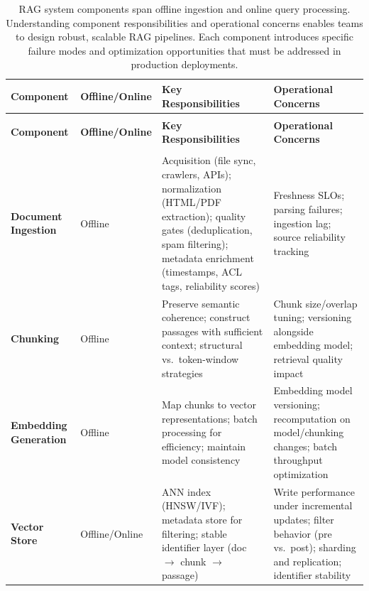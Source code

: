 {\footnotesize
\setlength{\tabcolsep}{4pt}
\renewcommand{\arraystretch}{1.15}
\begin{xltabular}{\linewidth}{@{}>{\raggedright\arraybackslash}p{2.8cm}>{\raggedright\arraybackslash}p{1.6cm}>{\raggedright\arraybackslash}X>{\raggedright\arraybackslash}X@{}}
\caption{RAG system components span offline ingestion and online query processing. Understanding component responsibilities and operational concerns enables teams to design robust, scalable RAG pipelines. Each component introduces specific failure modes and optimization opportunities that must be addressed in production deployments.}
\label{tab:ch08_rag_components}\\
\toprule
{}
\textbf{Component} & \textbf{Offline/Online} & \textbf{Key Responsibilities} & \textbf{Operational Concerns} \\
\midrule
\endfirsthead
{}\\
\toprule
{}
\textbf{Component} & \textbf{Offline/Online} & \textbf{Key Responsibilities} & \textbf{Operational Concerns} \\
\midrule
\endhead
\midrule
{}\\
\endfoot
\bottomrule
\endlastfoot
\textbf{Document Ingestion} & Offline & Acquisition (file sync, crawlers, APIs); normalization (HTML/PDF extraction); quality gates (deduplication, spam filtering); metadata enrichment (timestamps, ACL tags, reliability scores) & Freshness SLOs; parsing failures; ingestion lag; source reliability tracking \\
\addlinespace[1pt]
\textbf{Chunking} & Offline & Preserve semantic coherence; construct passages with sufficient context; structural vs.\ token-window strategies & Chunk size/overlap tuning; versioning alongside embedding model; retrieval quality impact \\
\addlinespace[1pt]
\textbf{Embedding Generation} & Offline & Map chunks to vector representations; batch processing for efficiency; maintain model consistency & Embedding model versioning; recomputation on model/chunking changes; batch throughput optimization \\
\addlinespace[1pt]
\textbf{Vector Store} & Offline/Online & ANN index (HNSW/IVF); metadata store for filtering; stable identifier layer (doc $\rightarrow$ chunk $\rightarrow$ passage) & Write performance under incremental updates; filter behavior (pre vs.\ post); sharding and replication; identifier stability \\

\end{xltabular}}
